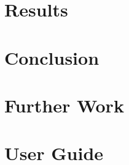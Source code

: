 \documentclass[12pt]{article}
\begin{document}


\newpage
\vspace*{6cm}


\newpage
\vspace*{6cm}


\newpage

\setcounter{tocdepth}{2}
\tableofcontents

\newpage





\newpage


\newpage






\newpage







\newpage


\section{Results}



\section{Conclusion}

\section{Further Work}

\section{User Guide}

\newpage
\appendix


\newpage

\end{document}
